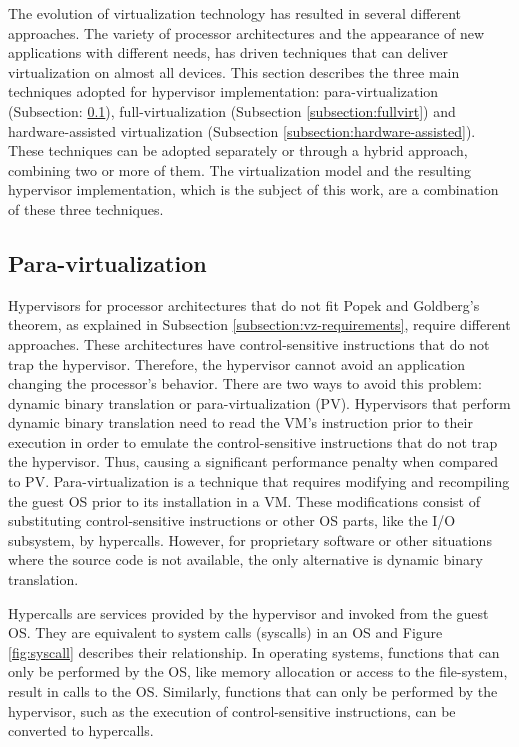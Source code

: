 The evolution of virtualization technology has resulted in several different ap\-proach\-es. The variety of processor architectures and the appearance of new applications with different needs, has driven  techniques that can deliver virtualization on almost all devices. This section describes the three main techniques adopted for hypervisor implementation: para-virtualization (Subsection: \ref{subsection:paravirt}), full-virtualization (Subsection \ref{subsection:fullvirt}) and hardware-assisted virtualization (Subsection \ref{subsection:hardware-assisted}).  These techniques can be adopted separately or  through a hybrid approach, combining two or more of them. The virtualization model and the resulting hypervisor implementation, which is the subject of this work, are a combination of these three techniques.

\subsection{Para-virtualization}
\label{subsection:paravirt}

Hypervisors for processor architectures that do not fit Popek and Goldberg’s theorem, as explained in Subsection \ref{subsection:vz-requirements}, require different approaches. These architectures have control-sensitive instructions that do not trap the hypervisor. Therefore,  the hypervisor cannot avoid an application changing the processor's behavior. There are two ways to avoid this problem: dynamic binary translation or para-virtualization (PV). Hypervisors that perform dynamic binary translation need to read the VM's instruction prior to their execution in order to emulate the control-sensitive instructions that do not trap the hypervisor. Thus, causing a significant performance penalty when compared to PV. Para-virtualization is a technique that requires modifying and recompiling the guest OS prior to its installation in a VM. These modifications consist of substituting control-sensitive instructions or other OS parts, like the I/O subsystem, by hypercalls. However, for proprietary software or other situations where the source code is not available, the only alternative is dynamic binary translation.  

Hypercalls are services provided by the hypervisor and invoked from the guest OS. They are equivalent to system calls (syscalls) in an OS and Figure \ref{fig:syscall} describes their relationship. In operating systems, functions that can only be performed by the OS, like memory allocation or access to the file-system, result in calls to the OS. Similarly, functions that can only be performed by the hypervisor, such as the execution of control-sensitive instructions, can be converted to hypercalls. 

